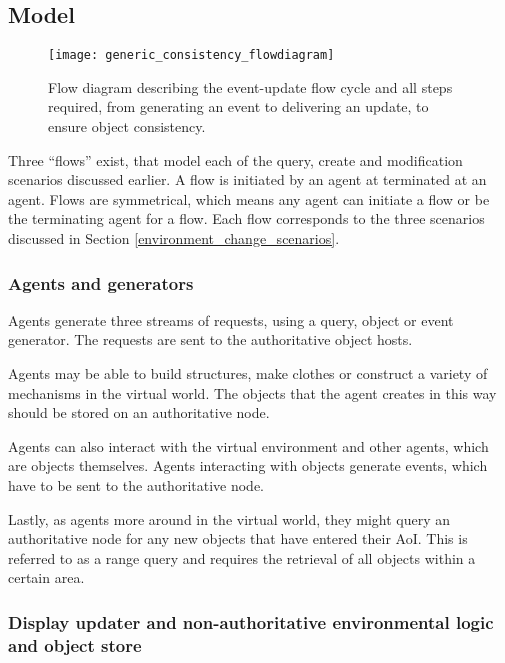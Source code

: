 \subsection{Model}

\begin{figure}[htbp]
 \centering
 \texttt{[image: generic\_consistency\_flowdiagram]}
 \caption{Flow diagram describing the event-update flow cycle and all steps required, from generating an event to delivering an update, to ensure object consistency.}
 \label{fig_event_update_flowdiagram}
\end{figure}

Three ``flows'' exist, that model each of the query, create and modification scenarios discussed earlier. A flow is initiated by an agent at terminated at an agent. Flows are symmetrical, which means any agent can initiate a flow or be the terminating agent for a flow. Each flow corresponds to the three scenarios discussed in Section \ref{environment_change_scenarios}.

\subsubsection{Agents and generators}

Agents generate three streams of requests, using a query, object or event generator. The requests are sent to the authoritative object hosts.

Agents may be able to build structures, make clothes or construct a variety of mechanisms in the virtual world. The objects that the agent creates in this way should be stored on an authoritative node.

Agents can also interact with the virtual environment and other agents, which are objects themselves. Agents interacting with objects generate events, which have to be sent to the authoritative node.

Lastly, as agents more around in the virtual world, they might query an authoritative node for any new objects that have entered their AoI. This is referred to as a range query and requires the retrieval of all objects within a certain area.

\subsubsection{Display updater and non-authoritative environmental logic and object store}

